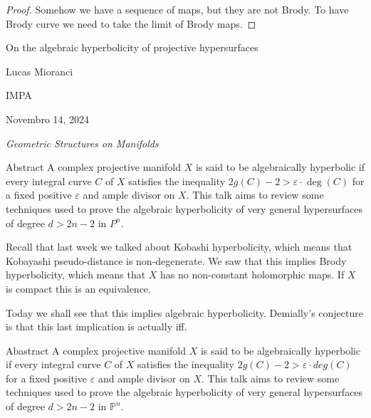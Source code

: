 \begin{proof}\leavevmode
Somehow we have a sequence of maps, but they are not Brody. To have Brody curve we need to take the limit of Brody maps.
\end{proof}

\clearpage{}
{\Huge On the algebraic hyperbolicity of projective hypersurfaces}

\hfill{\Large Lucas Mioranci}

{\Large \hfill IMPA}

\hfill{\large Novembro 14, 2024

\hfill \textit{Geometric Structures on Manifolds}}
\vspace{2em}

\begin{thing6}{Abstract}
A complex projective manifold \(X\) is said to be algebraically hyperbolic if every integral curve \(C\) of \(X\) satisfies the inequality \(2g(C)-2>\varepsilon \cdot \operatorname{deg}(C)\) for a fixed positive \(\varepsilon\) and ample divisor on \(X\). This talk aims to review some techniques used to prove the algebraic hyperbolicity of very general hypersurfaces of degree \(d>2n-2\) in \(P^n\).
\end{thing6}

\begin{upshot}\leavevmode
	Recall that last week we talked about Kobashi hyperbolicity, which means that Kobayashi pseudo-distance is non-degenerate. We saw that this implies Brody hyperbolicity, which means that $X$ has no non-constant holomorphic maps. If $X$ is compact this is an equivalence.

Today we shall see that this implies algebraic hyperbolicity. Demially's conjecture is that this last implication is actually iff.
\end{upshot}

\begin{thing4}{Abastract}\leavevmode
A complex projective manifold $X$ is said to be algebraically hyperbolic if every integral curve $C$ of $X$ satisfies the inequality $2g(C)-2>\varepsilon \cdot deg(C)$
 for a fixed positive $\varepsilon$ and ample divisor on $X$. This talk aims to review some techniques used to prove the algebraic hyperbolicity of very general hypersurfaces of degree $d>2n-2$ in $\mathbb{P}^n$.	
\end{thing4}

